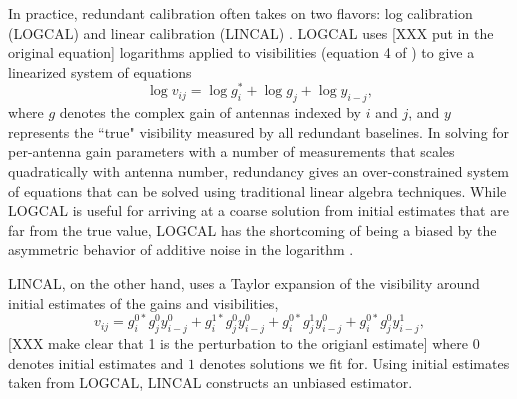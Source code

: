 \documentclass[twocolumn,numberedappendix]{emulateapj} \shorttitle{New Limits on the 21 cm Power Spectrum at $z=8.4$}
\begin{document}

In practice, redundant calibration often takes on two flavors: log calibration (LOGCAL) and
linear calibration (LINCAL) \citep{liu_et_al2010,zheng_et_al2014}. LOGCAL uses 
[XXX put in the original equation]
logarithms applied to visibilities (equation 4 of
\citealt{zheng_et_al2014}) to give a linearized system of equations
\begin{equation}\label{eqn:logcal}
    \log{v_{ij}} = \log{g_{i}^{*}} + \log{g_{j}} + \log{y_{i-j}},
\end{equation}
where $g$ denotes the 
complex gain of antennas indexed by $i$ and $j$, and $y$ represents the ``true" visibility 
measured by all redundant baselines.  In solving for per-antenna gain parameters with
a number of measurements that scales quadratically with antenna number, redundancy gives 
an over-constrained
system of equations that can be solved
using traditional linear algebra techniques.
While LOGCAL is useful for arriving at a coarse solution from initial estimates that are far
from the true value, LOGCAL has the shortcoming of being a biased by the asymmetric behavior
of additive noise in the logarithm \citep{liu_et_al2010}.

LINCAL, on the other hand, uses a Taylor expansion of the visibility around initial
estimates of the gains and visibilities, 
\begin{equation}\label{eqn:lincal}
v_{ij} = g_{i}^{0*}g_{j}^{0}y_{i-j}^{0} + g_{i}^{1*}g_{j}^{0}y_{i-j}^{0} +
         g_{i}^{0*}g_{j}^{1}y_{i-j}^{0}+g_{i}^{0*}g_{j}^{0}y_{i-j}^{1},
\end{equation}
[XXX make clear that 1 is the perturbation to the origianl estimate]
where $0$ denotes initial estimates and $1$ denotes 
solutions we fit for.  Using initial
estimates taken from LOGCAL, LINCAL constructs an unbiased estimator.
\end{document}
